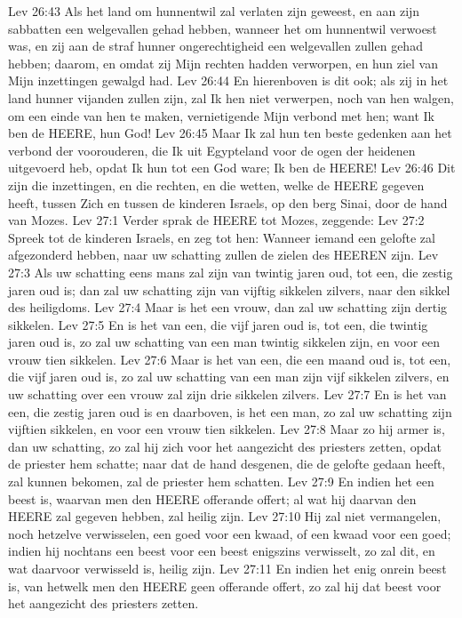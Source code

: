 Lev 26:43  Als het land om hunnentwil zal verlaten zijn geweest, en aan zijn sabbatten een welgevallen gehad hebben, wanneer het om hunnentwil verwoest was, en zij aan de straf hunner ongerechtigheid een welgevallen zullen gehad hebben; daarom, en omdat zij Mijn rechten hadden verworpen, en hun ziel van Mijn inzettingen gewalgd had.
Lev 26:44  En hierenboven is dit ook; als zij in het land hunner vijanden zullen zijn, zal Ik hen niet verwerpen, noch van hen walgen, om een einde van hen te maken, vernietigende Mijn verbond met hen; want Ik ben de HEERE, hun God!
Lev 26:45  Maar Ik zal hun ten beste gedenken aan het verbond der voorouderen, die Ik uit Egypteland voor de ogen der heidenen uitgevoerd heb, opdat Ik hun tot een God ware; Ik ben de HEERE!
Lev 26:46  Dit zijn die inzettingen, en die rechten, en die wetten, welke de HEERE gegeven heeft, tussen Zich en tussen de kinderen Israels, op den berg Sinai, door de hand van Mozes.
Lev 27:1  Verder sprak de HEERE tot Mozes, zeggende:
Lev 27:2  Spreek tot de kinderen Israels, en zeg tot hen: Wanneer iemand een gelofte zal afgezonderd hebben, naar uw schatting zullen de zielen des HEEREN zijn.
Lev 27:3  Als uw schatting eens mans zal zijn van twintig jaren oud, tot een, die zestig jaren oud is; dan zal uw schatting zijn van vijftig sikkelen zilvers, naar den sikkel des heiligdoms.
Lev 27:4  Maar is het een vrouw, dan zal uw schatting zijn dertig sikkelen.
Lev 27:5  En is het van een, die vijf jaren oud is, tot een, die twintig jaren oud is, zo zal uw schatting van een man twintig sikkelen zijn, en voor een vrouw tien sikkelen.
Lev 27:6  Maar is het van een, die een maand oud is, tot een, die vijf jaren oud is, zo zal uw schatting van een man zijn vijf sikkelen zilvers, en uw schatting over een vrouw zal zijn drie sikkelen zilvers.
Lev 27:7  En is het van een, die zestig jaren oud is en daarboven, is het een man, zo zal uw schatting zijn vijftien sikkelen, en voor een vrouw tien sikkelen.
Lev 27:8  Maar zo hij armer is, dan uw schatting, zo zal hij zich voor het aangezicht des priesters zetten, opdat de priester hem schatte; naar dat de hand desgenen, die de gelofte gedaan heeft, zal kunnen bekomen, zal de priester hem schatten.
Lev 27:9  En indien het een beest is, waarvan men den HEERE offerande offert; al wat hij daarvan den HEERE zal gegeven hebben, zal heilig zijn.
Lev 27:10  Hij zal niet vermangelen, noch hetzelve verwisselen, een goed voor een kwaad, of een kwaad voor een goed; indien hij nochtans een beest voor een beest enigszins verwisselt, zo zal dit, en wat daarvoor verwisseld is, heilig zijn.
Lev 27:11  En indien het enig onrein beest is, van hetwelk men den HEERE geen offerande offert, zo zal hij dat beest voor het aangezicht des priesters zetten.
